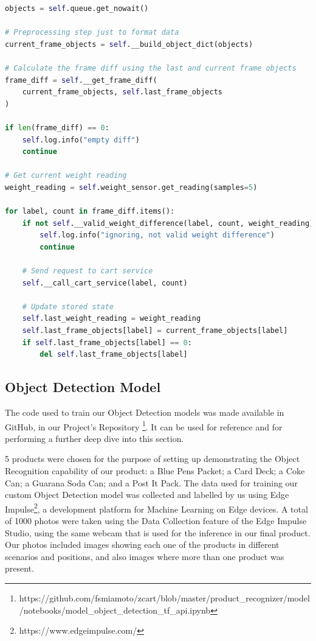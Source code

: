 \documentclass[openright]{normas-utf-tex} %
\begin{document}
\begin{lstlisting}[language=Python,caption={Product Recognizer thread logic}]
objects = self.queue.get_nowait()

# Preprocessing step just to format data
current_frame_objects = self.__build_object_dict(objects)

# Calculate the frame diff using the last and current frame objects
frame_diff = self.__get_frame_diff(
    current_frame_objects, self.last_frame_objects
)

if len(frame_diff) == 0:
    self.log.info("empty diff")
    continue

# Get current weight reading
weight_reading = self.weight_sensor.get_reading(samples=5)

for label, count in frame_diff.items():
    if not self.__valid_weight_difference(label, count, weight_reading):
        self.log.info("ignoring, not valid weight difference")
        continue

    # Send request to cart service
    self.__call_cart_service(label, count)

    # Update stored state
    self.last_weight_reading = weight_reading
    self.last_frame_objects[label] = current_frame_objects[label]
    if self.last_frame_objects[label] == 0:
        del self.last_frame_objects[label]
\end{lstlisting}

\subsection{Object Detection Model}

The code used to train our Object Detection models was made available in GitHub,
in our Project's Repository
\footnote{https://github.com/fsmiamoto/zcart/blob/master/product\_recognizer/model/notebooks/model\_object\_detection\_tf\_api.ipynb}.
It can be used for reference and for performing a further deep dive into this section.

5 products were chosen for the purpose of setting up demonstrating the Object Recognition 
capability of our product: a Blue Pens Packet; a Card Deck; a Coke Can; a Guarana Soda Can; 
and a Post It Pack. 
The data used for training our custom Object Detection model was collected and labelled by us
using Edge Impulse\footnote{https://www.edgeimpulse.com/}, a development platform for Machine 
Learning on Edge devices.
A total of 1000 photos were taken using the Data Collection feature of the Edge Impulse Studio,
using the same webcam that is used for the inference in our final product.
Our photos included images showing each one of the products in different scenarios and positions, 
and also images where more than one product was present.
\end{document}
